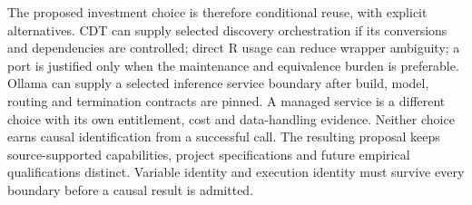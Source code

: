 The proposed investment choice is therefore conditional reuse, with explicit alternatives.
CDT can supply selected discovery orchestration if its conversions and dependencies are controlled;
direct R usage can reduce wrapper ambiguity; a port is justified only when the maintenance and
equivalence burden is preferable. Ollama can supply a selected inference service boundary after
build, model, routing and termination contracts are pinned. A managed service is a different
choice with its own entitlement, cost and data-handling evidence. Neither choice earns causal
identification from a successful call. The resulting proposal keeps source-supported capabilities,
project specifications and future empirical qualifications distinct.
Variable identity and execution identity must survive every boundary before a causal result is admitted.
